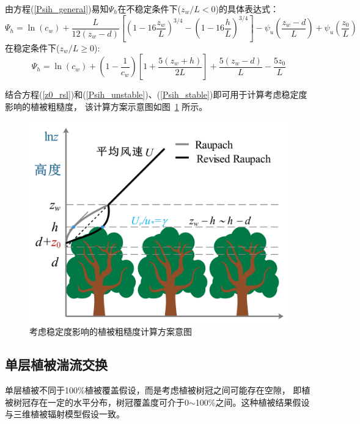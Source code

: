 由方程(\ref{Psih_general})易知$\Psi_{h}$在不稳定条件下($z_{w}/L < 0$)的具体表达式：
\begin{equation}\label{Psih_unstable}
\Psi_{h} = \ln \left(c_{w}\right) + \frac{L}{12\left(z_{w}-d\right)} \left[\left(1-16\frac{z_{w}}{L}\right)^{3/4} 
- \left(1-16\frac{h}{L}\right)^{3/4} \right] - \psi_u \left(\frac{z_{w}-d}{L} \right) + \psi_u \left(\frac{z_{0}}{L} \right)
\end{equation}
在稳定条件下($z_{w}/L \geqslant 0$):
\begin{equation}\label{Psih_stable}
\Psi_{h} = \ln \left(c_{w}\right) + \left(1-\frac{1}{c_{w}}\right) \left[1+\frac{5\left(z_{w}+h\right)}{2L}\right]
+ \frac{5\left(z_{w}-d\right)}{L} - \frac{5z_{0}}{L}
\end{equation}

结合方程(\ref{z0_rsl})和(\ref{Psih_unstable})、(\ref{Psih_stable})即可用于计算考虑稳定度影响的植被粗糙度，
该计算方案示意图如图~\ref{fig:修正Raupach粗糙度方案示意图} 所示。
{
\begin{figure}[]
\centering
\includegraphics[scale=0.7]{Figures/地表湍流交换过程/修正Raupach粗糙度方案示意图.jpg}
\caption{考虑稳定度影响的植被粗糙度计算方案意图}
\label{fig:修正Raupach粗糙度方案示意图}
\end{figure}
}


\subsection{单层植被湍流交换}
单层植被不同于100\%植被覆盖假设，而是考虑植被树冠之间可能存在空隙，
即植被树冠存在一定的水平分布，树冠覆盖度可介于0$\sim$100\%之间。这种植被结果假设与三维植被辐射模型假设一致。


